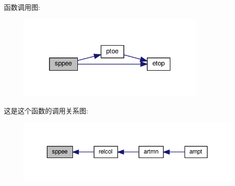 函数调用图\+:
\nopagebreak
\begin{figure}[H]
\begin{center}
\leavevmode
\includegraphics[width=265pt]{sppee_8f90_ac17982647426c7100b066b97810790e2_cgraph}
\end{center}
\end{figure}
这是这个函数的调用关系图\+:
\nopagebreak
\begin{figure}[H]
\begin{center}
\leavevmode
\includegraphics[width=350pt]{sppee_8f90_ac17982647426c7100b066b97810790e2_icgraph}
\end{center}
\end{figure}
